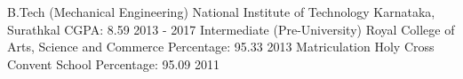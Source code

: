 \begin{cventries}
  \cventryedu
    {B.Tech (Mechanical Engineering)}
    {National Institute of Technology Karnataka, Surathkal}
    {CGPA: 8.59}
    {2013 - 2017}
  \cventryedu
    {Intermediate (Pre-University)}
    {Royal College of Arts, Science and Commerce}
    {Percentage: 95.33}
    { 2013 }
  \cventryedu
    {Matriculation}
    {Holy Cross Convent School}
    {Percentage: 95.09}
    { 2011 }
\end{cventries}
